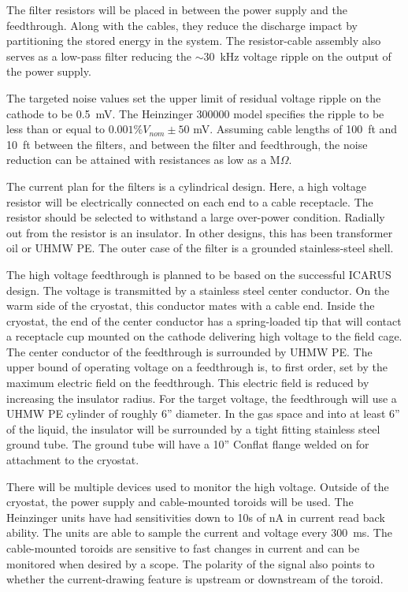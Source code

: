 The filter resistors will be placed in between the power supply and the feedthrough.  Along with the cables, they reduce the discharge impact by partitioning the stored energy in the system.  The resistor-cable assembly also serves as a low-pass filter reducing the $\sim$\SI{30}{kHz} voltage ripple on the output of the power supply.

The targeted noise values set the upper limit of residual voltage ripple on the cathode to be \SI{0.5}{mV}.  The Heinzinger 300000 model specifies the ripple to be less than or equal to $0.001\%V_{nom} \pm 50$ mV.  Assuming cable lengths of \SI{100}{ft} and \SI{10}{ft} between the filters, and between the filter and feedthrough, the noise reduction can be attained with resistances as low as a M$\Omega$. 

The current plan for the filters is a cylindrical design.  Here, a high voltage resistor will be electrically connected on each end to a cable receptacle.  The resistor should be selected to withstand a large over-power condition.  Radially out from the resistor is an insulator.  In other designs, this has been transformer oil or UHMW PE.  The outer case of the filter is a grounded stainless-steel shell.

The high voltage feedthrough is planned to be based on the successful ICARUS design.  The voltage is transmitted by a stainless steel center conductor.  On the warm side of the cryostat, this conductor mates with a cable end.  Inside the cryostat, the end of the center conductor has a spring-loaded tip that will contact a receptacle cup mounted on the cathode delivering high voltage to the field cage.  The center conductor of the feedthrough is surrounded by UHMW PE.  The upper bound of operating voltage on a feedthrough is, to first order, set by the maximum electric field on the feedthrough.  This electric field is reduced by increasing the insulator radius.  For the target voltage, the feedthrough will use a UHMW PE cylinder of roughly 6'' diameter.  In the gas space and into at least 6'' of the liquid, the insulator will be surrounded by a tight fitting stainless steel ground tube.  The ground tube will have a 10'' Conflat flange welded on for attachment to the cryostat.

There will be multiple devices used to monitor the high voltage.  Outside of the cryostat, the power supply and cable-mounted toroids will be used.  The Heinzinger units have had sensitivities down to 10s of nA in current read back ability.  The units are able to sample the current and voltage every \SI{300}{ms}.  The cable-mounted toroids are sensitive to fast changes in current and can be monitored when desired by a scope.  The polarity of the signal also points to whether the current-drawing feature is upstream or downstream of the toroid.

